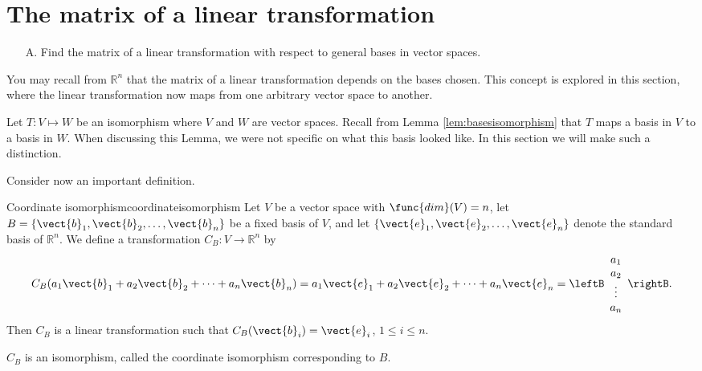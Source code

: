 \section{The matrix of a linear transformation}

\begin{outcome}

\begin{enumerate}

\item[A.] Find the matrix of a linear transformation with respect to general bases in vector spaces. 

\end{enumerate}
\end{outcome}

You may recall from $\mathbb{R}^n$ that the matrix of a linear transformation depends on the bases chosen. This concept is explored in this section, where the linear transformation now maps from one arbitrary vector space to another. 

Let $T: V \mapsto W$ be an isomorphism where $V$ and $W$ are vector spaces. Recall from Lemma \ref{lem:basesisomorphism} that $T$ maps a basis in $V$ to a basis in $W$. When discussing this Lemma, we were not specific on what this basis looked like. In this section we will make such a distinction. 

Consider now an important definition.

\begin{definition}{Coordinate isomorphism}{coordinateisomorphism}
Let $V$ be a vector space with $\func{dim}(V)=n$, let $B=\{ \vect{b}_1, \vect{b}_2, \ldots, \vect{b}_n \}$ be a fixed basis of $V$,
and let $\{ \vect{e}_1, \vect{e}_2, \ldots, \vect{e}_n \}$
denote the standard basis of $\mathbb{R}^n$.
We define a transformation $C_B:V\to\mathbb{R}^n$ by
\[
C_B(a_1\vect{b}_1 + a_2\vect{b}_2 + \cdots + a_n\vect{b}_n)
=
a_1\vect{e}_1 + a_2\vect{e}_2 + \cdots + a_n\vect{e}_n
=
\leftB\begin{array}{c} a_1 \\ a_2 \\ \vdots \\ a_n
\end{array}\rightB.\]
Then $C_B$ is a linear transformation
such that
$C_B(\vect{b}_i)=\vect{e}_i$, $1\leq i\leq n$.

$C_B$ is an isomorphism, called
the coordinate isomorphism corresponding to $B$.
\end{definition}

